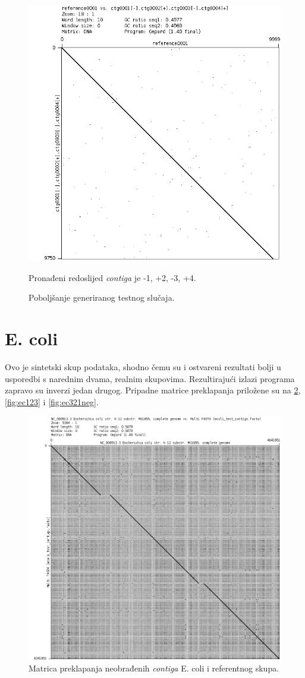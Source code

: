 \documentclass[times, utf8, seminar, numeric]{fer}
\begin{document}
\begin{figure}[h]
	\centering
	\centerline{\includegraphics[width=0.7\linewidth]{img/generated_reference}}
	\caption{Poboljšanje generiranog testnog slučaja.}
	\label{fig:generatedreference}
	\small
	Pronađeni redoslijed \textit{contiga} je -1, +2, -3, +4.
\end{figure}


\section{E. coli}
Ovo je sintetski skup podataka, shodno čemu su i ostvareni rezultati bolji u usporedbi s narednim dvama, realnim skupovima. Rezultirajući izlazi programa zapravo su inverzi jedan drugog. Pripadne matrice preklapanja priložene su na \ref{fig:eccontigs}, \ref{fig:ec123} i \ref{fig:ec321neg}.

\begin{figure}[h]
	\centering
	\centerline{\includegraphics[width=0.7\linewidth]{img/ec_contigs}}
	\caption{Matrica preklapanja neobrađenih \textit{contiga} E. coli i referentnog skupa.}
	\label{fig:eccontigs}
\end{figure}
\end{document}
